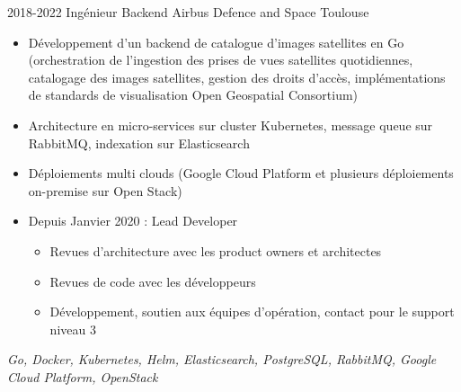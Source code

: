 \cventry
    {2018-2022}
    {Ingénieur Backend}
    {}
    {Airbus Defence and Space}
    {Toulouse}
    {
        \begin{itemize}
            \item Développement d'un backend de catalogue d'images satellites en Go (orchestration de l'ingestion des prises de vues satellites quotidiennes, catalogage des images satellites, gestion des droits d'accès, implémentations de standards de visualisation Open Geospatial Consortium)
            \item Architecture en micro-services sur cluster Kubernetes, message queue sur RabbitMQ, indexation sur Elasticsearch
            \item Déploiements multi clouds (Google Cloud Platform et plusieurs déploiements on-premise sur Open Stack)
            \item Depuis Janvier 2020 : Lead Developer
            \begin{itemize}
                \item Revues d'architecture avec les product owners et architectes
                \item Revues de code avec les développeurs
                \item Développement, soutien aux équipes d'opération, contact pour le support niveau 3
            \end{itemize}
        \end{itemize}
        \textit{Go, Docker, Kubernetes, Helm, Elasticsearch, PostgreSQL, RabbitMQ, Google Cloud Platform, OpenStack}
    }
\vspace*{0.2cm}
